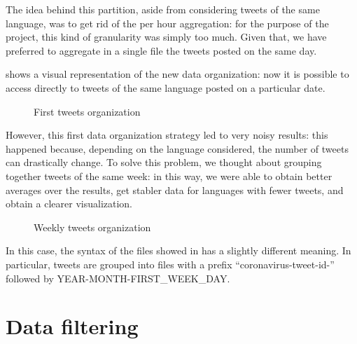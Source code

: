 The idea behind this partition, aside from considering tweets of the same language, was to get rid of the per hour aggregation: for the purpose of the project, this kind of granularity was simply too much. Given that, we have preferred to aggregate in a single file the tweets posted on the same day.

 shows a visual representation of the new data organization: now it is possible to access directly to tweets of the same language posted on a particular date.

\begin{figure}[H]
	\caption{First tweets organization}
	\label{fig:tweet-org-1}
\end{figure}

However, this first data organization strategy led to very noisy results: this happened because, depending on the language considered, the number of tweets can drastically change. To solve this problem, we thought about grouping together tweets of the same week: in this way, we were able to obtain better averages over the results, get stabler data for languages with fewer tweets, and obtain a clearer visualization.

\begin{figure}[H]
	\caption{Weekly tweets organization}
	\label{fig:tweet-org-2}
\end{figure}

In this case, the syntax of the files showed in  has a slightly different meaning. In particular, tweets are grouped into files with a prefix “coronavirus-tweet-id-” followed by YEAR-MONTH-FIRST\_WEEK\_DAY.

\section{Data filtering}
\label{sec:data-filtering}


